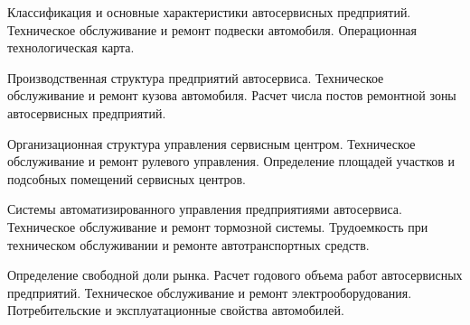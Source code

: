 \documentclass[
	11pt,
	a4paper,
	]
	{article}
\begin{document}
\bigskip

\noindent{} 
	{
		Классификация и основные характеристики автосервисных предприятий.
	}{
		Техническое обслуживание и ремонт подвески автомобиля.
	}{
		Операционная технологическая карта.
	}

\bigskip

\noindent{} 
	{
		Производственная структура предприятий автосервиса.
	}{
		Техническое обслуживание и ремонт кузова автомобиля.
	}{
		Расчет числа постов ремонтной зоны автосервисных предприятий.
	}

\bigskip

\noindent{} 
	{
		Организационная структура управления сервисным центром.
	}{
		Техническое обслуживание и ремонт рулевого управления.
	}{
		Определение площадей участков и подсобных помещений сервисных центров.
	}

\bigskip

\noindent{} 
	{
		Системы автоматизированного управления предприятиями автосервиса.
	}{
		Техническое обслуживание и ремонт тормозной системы.
	}{
		Трудоемкость при техническом обслуживании и ремонте автотранспортных средств.
	}

\bigskip

\noindent{} 
	{
		Определение свободной доли рынка. Расчет годового объема работ автосервисных предприятий.
	}{
		Техническое обслуживание и ремонт электрооборудования.
	}{
		Потребительские и эксплуатационные свойства автомобилей.
	}

\bigskip
\end{document}
